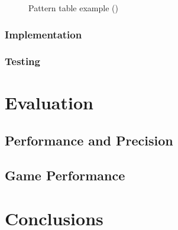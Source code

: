 \documentclass[]{report}
\begin{document}
 \begin{figure}[!htb]
 	\caption{\label{fig:my-label} Pattern table example (\cite{PTRN})}
 \end{figure}
 \clearpage

\subsection{Implementation}

\subsection{Testing}

 \chapter{Evaluation}

\section{Performance and Precision}

\section{Game Performance}

\chapter{Conclusions}

\printbibliography
\end{document}
